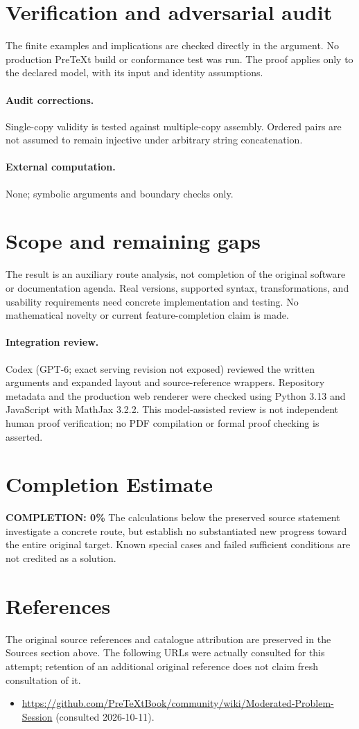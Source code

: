\documentclass[11pt]{article}
\begin{document}
\section{Verification and adversarial audit}
The finite examples and implications are checked directly in the argument. No production PreTeXt build or conformance test was run. The proof applies only to the declared model, with its input and identity assumptions.
\paragraph{Audit corrections.} Single-copy validity is tested against multiple-copy assembly. Ordered pairs are not assumed to remain injective under arbitrary string concatenation.
\paragraph{External computation.} None; symbolic arguments and boundary checks only.
\section{Scope and remaining gaps}
The result is an auxiliary route analysis, not completion of the original software or documentation agenda. Real versions, supported syntax, transformations, and usability requirements need concrete implementation and testing. No mathematical novelty or current feature-completion claim is made.
\paragraph{Integration review.} Codex (GPT-6; exact serving revision not exposed) reviewed the written arguments and expanded layout and source-reference wrappers. Repository metadata and the production web renderer were checked using Python 3.13 and JavaScript with MathJax 3.2.2. This model-assisted review is not independent human proof verification; no PDF compilation or formal proof checking is asserted.

\section{Completion Estimate}
\noindent\textbf{COMPLETION: 0\%}
The calculations below the preserved source statement investigate a concrete route,
but establish no substantiated new progress toward the entire original target.
Known special cases and failed sufficient conditions are not credited as a solution.
\section{References}
The original source references and catalogue attribution are preserved in the
Sources section above. The following URLs were actually consulted for this attempt;
retention of an additional original reference does not claim fresh consultation of it.
\begin{itemize}
\item \url{https://github.com/PreTeXtBook/community/wiki/Moderated-Problem-Session} (consulted 2026-10-11). 
\end{itemize}
\end{document}
